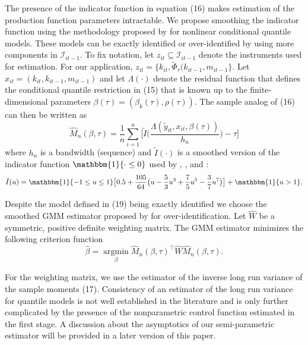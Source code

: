 \documentclass[11pt]{article}
\begin{document}
The presence of the indicator function in equation (16) makes estimation of the production function parameters intractable. We propose smoothing the indicator function using the methodology proposed by \cite*{qgmm} for nonlinear conditional quantile models. These models can be exactly identified or over-identified by using more components in $\mathcal{I}_{it-1}$. To fix notation, let $z_{it}\subseteq \mathcal{I}_{it-1}$ denote the instruments used for estimation. For our application, $z_{it}=\{k_{it}, \tilde{\Phi}_{\tau}(k_{it-1}, m_{it-1}\}$. Let $x_{it}=(k_{it}, k_{it-1}, m_{it-1})$ and let $\Lambda(\cdot)$ denote the residual function that defines the conditional quantile restriction in (15) that is known up to the finite-dimensional parameters $\beta(\tau)=(\beta_{k}(\tau), \rho(\tau))$. The sample analog of (16) can then be written as
\begin{equation}
    \hat{M}_{n}(\beta, \tau)=\frac{1}{n}\sum_{i=1}^{n}\Bigg[\tilde{I}\Bigg(\frac{\Lambda(\tilde{y}_{it}, x_{it}, \beta(\tau))}{h_{n}}\Bigg)-\tau\Bigg]
\end{equation}
where $h_{n}$ is a bandwidth (sequence) and $\tilde{I}(\cdot)$ is a smoothed version of the indicator function $\mathbbm{1}\{\cdot \leq 0\}$ used by \cite{Horowitz1998}, \cite{Whang2006}, and \cite{Kaplan2016}:
\begin{equation}
    \tilde{I}(u)=\mathbbm{1}\{-1\leq u \leq 1\}\big[0.5+\frac{105}{64}\big(u-\frac{5}{3}u^{3}+\frac{7}{5}u^{5}- \frac{3}{7}u^{7}\big)\big]+\mathbbm{1}\{u>1\}.
\end{equation}

Despite the model defined in (19) being exactly identified we choose the smoothed GMM estimator proposed by \cite{qgmm} for over-identification. Let $\hat{W}$ be a symmetric, positive definite weighting matrix. The GMM estimator minimizes the following criterion function
\begin{equation}
\hat{\beta}=\underset{\beta}{\operatorname{argmin}}\hat{M}_{n}(\beta, \tau)^{\top}\hat{W}\hat{M}_{n}(\beta, \tau).
\end{equation}

For the weighting matrix, we use the estimator of the inverse long run variance of the sample moments (17). Consistency of an estimator of the long run variance for quantile models is not well established in the literature and is only further complicated by the presence of the nonparametric control function estimated in the first stage. A discussion about the asymptotics of our semi-parametric estimator will be provided in a later version of this paper.
\end{document}

